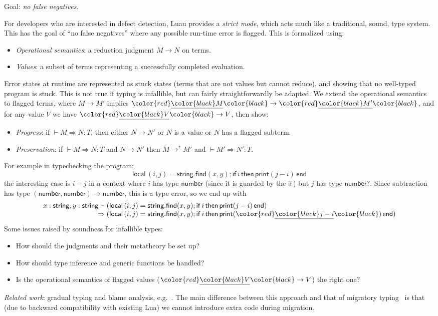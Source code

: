 \documentclass[acmsmall]{acmart}
\newcommand{\squnder}[1]{\color{red}\underline{{\color{black}#1}}\color{black}}
\newcommand{\NUMBER}{\mathsf{number}}
\newcommand{\STRING}{\mathsf{string}}
\newcommand{\IF}{\mathsf{if}\,}
\newcommand{\LOCAL}{\mathsf{local}\,}
\newcommand{\THEN}{\,\mathsf{then}\,}
\newcommand{\END}{\,\mathsf{end}}
\newcommand{\FIND}{\mathsf{find}}
\newcommand{\PRINT}{\mathsf{print}}
\begin{document}
Goal: \emph{no false negatives.}

For developers who are interested in defect detection, Luau provides a \emph{strict mode},
which acts much like a traditional, sound, type system. This has the goal of ``no false negatives''
where any possible run-time error is flagged. This is formalized using:
\begin{itemize}
\item \emph{Operational semantics}: a reduction judgment $M \rightarrow N$ on terms.
\item \emph{Values}: a subset of terms representing a successfully completed evaluation.
\end{itemize}
Error states at runtime are represented as stuck states (terms that are not
values but cannot reduce), and showing that no well-typed program is
stuck. This is not true if typing is infallible, but can fairly
straightforwardly be adapted. We extend the operational semantics to flagged terms,
where $M \rightarrow M'$ implies $\squnder{M} \rightarrow \squnder{M'}$, and
for any value $V$ we have $\squnder{V} \rightarrow V$, then show:
\begin{itemize}
\item \emph{Progress}: if ${} \vdash M \Rightarrow N : T$, then either $N \rightarrow N'$ or $N$ is a value or $N$ has a flagged subterm.
\item \emph{Preservation}: if ${} \vdash M \Rightarrow N : T$ and $N \rightarrow N'$ then  $M \rightarrow^*M'$ and ${} \vdash M' \Rightarrow N' : T$.
\end{itemize}
For example in typechecking the program:
\[
  \LOCAL (i,j) = \STRING.\FIND(x, y);
  \IF i \THEN \PRINT(j-i) \END
\]
the interesting case is $i-j$ in a context where  $i$ has type
$\NUMBER$ (since it is guarded by the $\IF$) but $j$ has type
$\NUMBER?$. Since subtraction has type $(\NUMBER, \NUMBER) \rightarrow \NUMBER$,
this is a type error, so we end up with
\[\begin{array}{r@{}l}
  x: \STRING, y: \STRING \vdash {}&
  (\LOCAL (i,j) = \STRING.\FIND(x, y);
  \IF i \THEN \PRINT(j-i) \END) \\
  \Rightarrow {}&
  (\LOCAL (i,j) = \STRING.\FIND(x, y);
  \IF i \THEN \PRINT(\squnder{j-i}) \END)
\end{array}\]
Some issues raised by soundness for infallible types:
\begin{itemize}
\item How should the judgments and their metatheory be set up?
\item How should type inference and generic functions be handled?
\item Is the operational semantics of flagged values
  ($\squnder{V} \rightarrow V$) the right one?
\end{itemize}
\emph{Related work}: gradual typing and blame analysis, e.g.~\cite{GradualTyping,WellTyped,Contracts}.
The main difference between this approach and that of migratory typing~\cite{MigratoryTyping}
is that (due to backward compatibility with existing Lua) we cannot introduce
extra code during migration.
\end{document}
